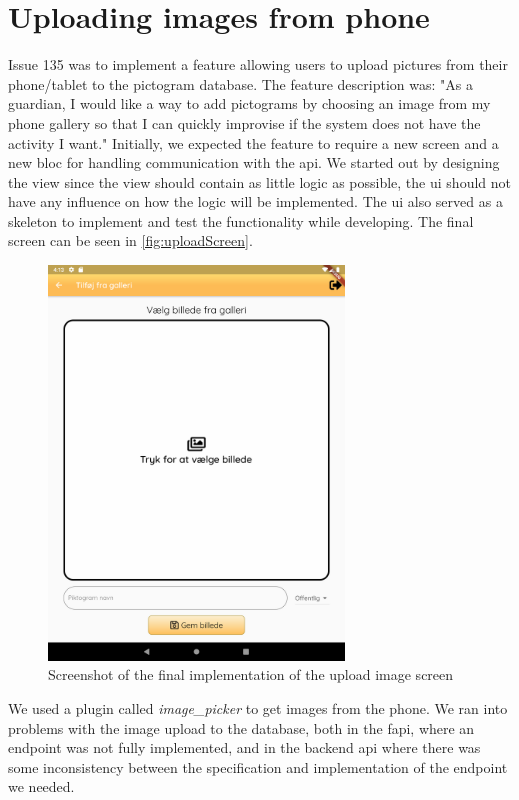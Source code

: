 \section{Uploading images from phone}

Issue 135 was to implement a feature allowing users to upload pictures from their phone/tablet to the pictogram database. The feature description was: "As a guardian, I would like a way to add pictograms by choosing an image from my phone gallery so that I can quickly improvise if the system does not have the activity I want."
Initially, we expected the feature to require a new screen and a new \gls{bloc} for handling communication with the api. We started out by designing the view since the view should contain as little logic as possible, the \gls{ui} should not have any influence on how the logic will be implemented. The \gls{ui} also served as a skeleton to implement and test the functionality while developing. The final screen can be seen in \autoref{fig:uploadScreen}.

\begin{figure}[!ht]
  \centering
  \includegraphics[width=0.7\textwidth]{figures/uploadPictogramScreen.png}
  \caption{Screenshot of the final implementation of the upload image screen}
  \label{fig:uploadScreen}
\end{figure}

We used a plugin called \textit{image\_picker} to get images from the phone.
We ran into problems with the image upload to the database, both in the \gls{fapi}, where an endpoint was not fully implemented, and in the backend \gls{api} where there was some inconsistency between the specification and implementation of the endpoint we needed. 

